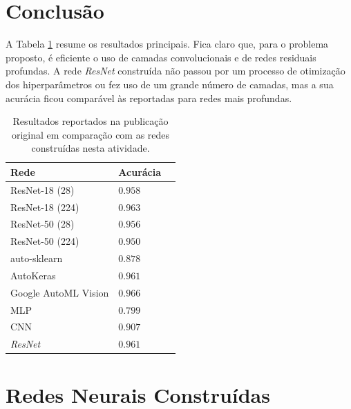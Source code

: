 \documentclass[final,5p]{elsarticle}
\numberwithin{equation}{section}
\begin{document}
    \section{Conclusão}

    A Tabela \ref{tab:resultados_resumo} resume os resultados principais. Fica claro que, para o problema proposto, é eficiente o uso de camadas convolucionais e de redes residuais profundas. A rede \emph{ResNet} construída não passou por um processo de otimização dos hiperparâmetros ou fez uso de um grande número de camadas, mas a sua acurácia ficou comparável às reportadas para redes mais profundas.

    \begin{table}[h]
        \centering
        \begin{tabular}{l l c}
            \toprule
            \textbf{Rede} & \textbf{Acurácia} \\
            \midrule
            ResNet-18 (28) & $0.958$ \\
            ResNet-18 (224) & $0.963$ \\
            ResNet-50 (28) & $0.956$ \\
            ResNet-50 (224) & $0.950$ \\
            auto-sklearn & $0.878$ \\
            AutoKeras & $0.961$ \\
            Google AutoML Vision & $0.966$ \\
            \midrule
            MLP & $0.799$ \\
            CNN & $0.907$ \\
            \emph{ResNet} & $0.961$ \\
            \bottomrule
        \end{tabular}
        \caption{Resultados reportados na publicação original \cite{medmnistv2} em comparação com as redes construídas nesta atividade.}
        \label{tab:resultados_resumo}
    \end{table}

\appendix

    \section{Redes Neurais Construídas}
\end{document}
